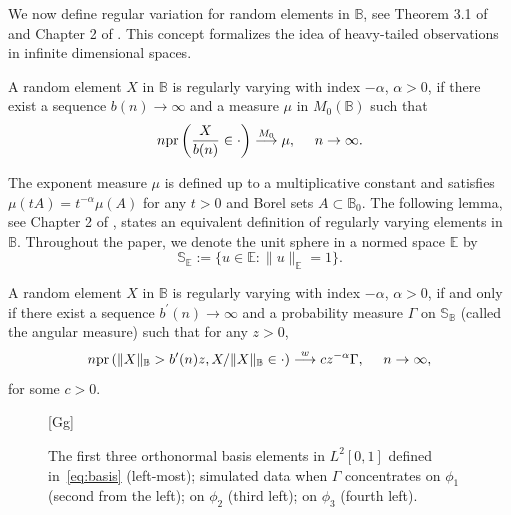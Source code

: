 \documentclass[lineno]{biometrika}
\newcommand \ag{\alpha}
\newcommand \Gg{\Gamma}
\newcommand\mbB{{\mathbb B}}
\newcommand\mbE{{\mathbb E}}
\newcommand\mbS{{\mathbb S}}
\newcommand\lp{\left (}
\newcommand\rp{\right )}
\begin{document}
We now define regular variation for random elements in $\mbB$, see Theorem 3.1 of~\citet{hult:lindskog:2006} and Chapter 2 of \citet{meinguet:2010}. This concept formalizes the idea of heavy-tailed observations in infinite dimensional spaces.


\begin{definition} \label{d:RVinL2}
A random element $X$ in $\mbB$ is regularly varying with index $-\ag$, $\ag> 0$, if there exist a sequence $b(n) \to \infty$ and a measure $\mu$ in $M_0(\mbB)$ such that
\begin{equation} \label{eq:def1-H}
n{\rm pr} \lp  \frac{X}{b(n)}  \in \cdot \rp
\stackrel{M_0}{\longrightarrow} \mu, \ \ \ \ n \to \infty.
\end{equation}


\end{definition}

The exponent measure $\mu$ is defined up to a multiplicative
constant and satisfies  $\mu(tA) = t^{-\ag}\mu(A)$ for any $t>0$ and Borel sets $A \subset \mbB_0$. The following lemma, see Chapter 2 of \citet{meinguet:2010}, states an equivalent definition of regularly varying  elements in $\mbB$. Throughout the paper, we denote the unit sphere in a normed space $\mbE$ by
\[
\mbS_{\mbE} := \{ u \in \mbE : \|u\|_{\mbE} = 1 \}.
\]



\begin{lemma} \label{l:pol-L2}
A random element $X$ in $\mbB$ is regularly varying with index $-\ag$, $\ag> 0$, if and only if there exist a sequence $b^{\prime}(n) \to \infty$ and a probability measure $\Gg$ on $\mbS_{\mbB}$  (called the angular measure) such that for any $z>0$,
\begin{equation} \label{eq:def2-H}
n{\rm pr} \lp \| X  \|_{\mbB} >b^{\prime}(n)z, X/\| X  \|_{\mbB} \in \cdot \rp
\stackrel{w}{\longrightarrow} c z^{-\ag}\Gg, \ \ \ \ n \to \infty,
\end{equation}
for some $c>0$.
\end{lemma}


\begin{figure}[t]
\figurebox{20pc}{25pc}{}[Gg]
\caption{The first three orthonormal basis elements in $L^2[0,1]$ defined in~\eqref{eq:basis} (left-most); simulated data when $\Gg$ concentrates on $\phi_1$(second from the left); on $\phi_2$ (third left); on $\phi_3$ (fourth left).
\label{f:Gg}}
\end{figure}
\end{document}
